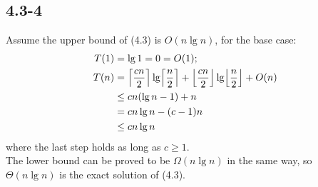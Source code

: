 \subsection{4.3-4}
    Assume the upper bound of (4.3) is $O(n\lg n)$, for the base case:
    \begin{align*}
        T(1) &= \lg 1 = 0 = O(1); \\
        T(n) &= \ceil[\Big]{\frac{cn}{2}}\lg \ceil[\Big]{\frac{n}{2}} +
                \floor[\Big]{\frac{cn}{2}} \lg \floor[\Big]{\frac{n}{2}} +
                O(n) \\
             &\le cn(\lg n - 1) + n \\
             &= cn\lg n - (c - 1)n \\
             &\le cn\lg n
    \end{align*}
    where the last step holds as long as $c \ge 1$. \\
    The lower bound can be proved to be $\Omega(n\lg n)$ in the same way, so
    $\Theta(n\lg n)$ is the exact solution of (4.3).
